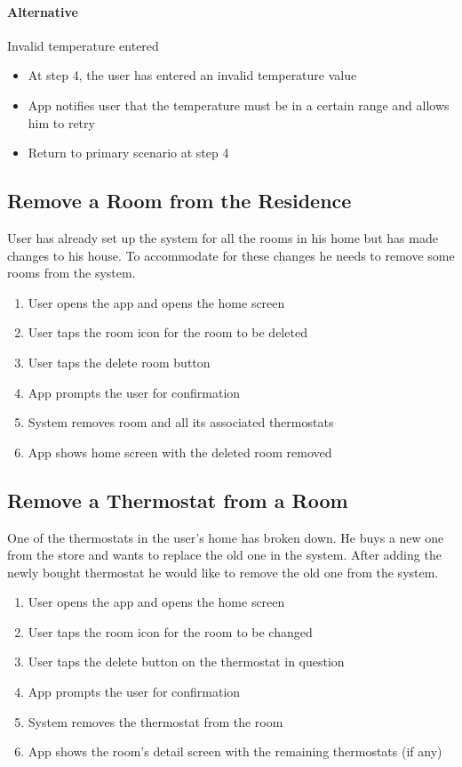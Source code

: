 \paragraph{Alternative} Invalid temperature entered
\begin{itemize}
    \item At step 4, the user has entered an invalid temperature value
    \item App notifies user that the temperature must be in a certain range and allows him to retry
    \item Return to primary scenario at step 4
\end{itemize}

\subsection*{Remove a Room from the Residence}
User has already set up the system for all the rooms in his home but has made changes to his house. To accommodate for these changes he needs to remove some rooms from the system.
\begin{enumerate}
    \item User opens the app and opens the home screen
    \item User taps the room icon for the room to be deleted
    \item User taps the delete room button
    \item App prompts the user for confirmation
    \item System removes room and all its associated thermostats
    \item App shows home screen with the deleted room removed
\end{enumerate}

\subsection*{Remove a Thermostat from a Room}
One of the thermostats in the user's home has broken down. He buys a new one from the store and wants to replace the old one in the system. After adding the newly bought thermostat he would like to remove the old one from the system.
\begin{enumerate}
    \item User opens the app and opens the home screen
    \item User taps the room icon for the room to be changed
    \item User taps the delete button on the thermostat in question
    \item App prompts the user for confirmation
    \item System removes the thermostat from the room
    \item App shows the room's detail screen with the remaining thermostats (if any)
\end{enumerate}

